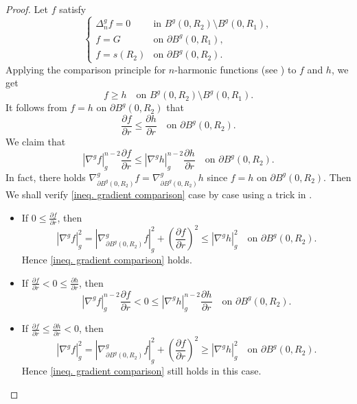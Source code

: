 \documentclass[10pt,a4paper]{amsart}
\numberwithin{equation}{section}
\newcommand{\nablag}{\nabla^g} %
\begin{document}
\begin{proof}
    Let $f$ satisfy
    \[
        \begin{cases}
            \Delta_n^g f=0 &\text{in } B^g(0,R_2)\setminus B^g(0,R_1),\\
            f=G &\text{on } \partial B^g(0,R_1),\\
            f=s(R_2) &\text{on } \partial B^g(0,R_2).
        \end{cases}
    \]
Applying the comparison principle for $n$-harmonic functions (see \cite[Theorem 2.15]{L}) to $f$ and $h$, we get
    \[
        f\geq h \quad \text{on } B^g(0,R_2)\setminus B^g(0,R_1).
    \]
    It follows from $f=h$ on $\partial B^g(0,R_2)$ that 
    \[
        \frac{\partial f}{\partial r} \leq \frac{\partial h}{\partial r} \quad \text{on } \partial B^g(0,R_2).
    \]
    We claim that
    \begin{equation}\label{ineq. gradient comparison}
        |\nablag f|_g^{n-2}\frac{\partial f}{\partial r}
        \leq  
        |\nablag h|_g^{n-2}\frac{\partial h}{\partial r} 
        \quad \text{on } \partial B^g(0,R_2).
    \end{equation}
    In fact, there holds $\nabla_{\partial B^g(0,R_2)}^g f=\nabla_{\partial B^g(0,R_2)}^g h$ since $f=h$ on $\partial B^g(0,R_2)$. Then We shall verify \cref{ineq. gradient comparison} case by case using a trick in \cite[Theorem 5.2]{MQ}.
    \begin{itemize}
        \item If $0\leq \frac{\partial f}{\partial r}$, then 
        \[
            |\nablag f|_g^2=|\nabla_{\partial B^g(0,R_2)}^g f|_g^2+(\frac{\partial f}{\partial r})^2
            \leq |\nablag h|_g^2
             \quad \text{on } \partial B^g(0,R_2).
        \]
        Hence \cref{ineq. gradient comparison} holds.
        \item If $\frac{\partial f}{\partial r}<0\leq \frac{\partial h}{\partial r}$, then
        \[
            |\nablag f|_g^{n-2}\frac{\partial f}{\partial r}<0\leq |\nablag h|_g^{n-2}\frac{\partial h}{\partial r}
             \quad \text{on } \partial B^g(0,R_2).
        \]
        \item If $\frac{\partial f}{\partial r}\leq \frac{\partial h}{\partial r}<0$, then
        \[
            |\nablag f|_g^2=|\nabla_{\partial B^g(0,R_2)}^g f|_g^2+(\frac{\partial f}{\partial r})^2
            \geq |\nablag h|_g^2
             \quad \text{on } \partial B^g(0,R_2).
        \]
        Hence \cref{ineq. gradient comparison} still holds in this case.
    \end{itemize}


\end{proof}
\end{document}
